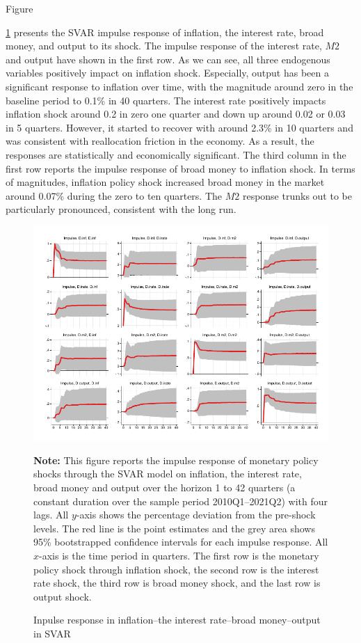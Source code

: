 \documentclass[11pt,letterpaper]{article}
\begin{document}
Figure {\ref{fig:varsvar2} presents the SVAR impulse response of inflation, the interest rate, broad money, and output to its shock. The impulse response of the interest rate, $M2$ and output have shown in the first row. As we can see, all three endogenous variables positively impact on inflation shock. Especially, output has been a significant response to inflation over time, with the magnitude around zero in the baseline period to 0.1\% in 40 quarters. The interest rate positively impacts inflation shock around 0.2 in zero one quarter and down up around 0.02 or 0.03 in 5 quarters. However, it started to recover with around 2.3\% in 10 quarters and was consistent with reallocation friction in the economy. As a result, the responses are statistically and economically significant. The third column in the first row reports the impulse response of broad money to inflation shock. In terms of magnitudes, inflation policy shock increased broad money in the market around 0.07\% during the zero to ten quarters. The $M2$ response trunks out to be particularly pronounced, consistent with the long run. 
\begin{figure}[H]
	\centering
	\caption{Inpulse response in inflation--the interest rate--broad money--output in SVAR}
	\label{fig:varsvar2}
	\vspace{-1em}
	\includegraphics[width=1\linewidth]{../../empirical/Marcodata/Graphs/var_svar2}
	\vspace{-2.5em}
	\begin{tablenotes}
		\footnotesize
		\item \textbf{Note:} This figure reports the impulse response of monetary policy shocks through the SVAR model on inflation, the interest rate, broad money and output over the horizon 1 to 42 quarters (a constant duration over the sample period 2010Q1–2021Q2) with four lags. All $y$-axis shows the percentage deviation from the pre-shock levels. The red line is the point estimates and the grey area shows 95\% bootstrapped confidence intervals for each impulse response. All $x$-axis is the time period in quarters. The first row is the monetary policy shock through inflation shock, the second row is the interest rate shock, the third row is broad money shock, and the last row is output shock. 
		

\end{tablenotes}
\end{figure}}
\end{document}

